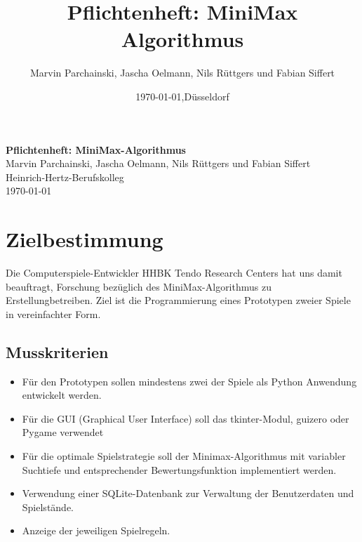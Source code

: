 \documentclass[14pt]{scrartcl}
\title{Pflichtenheft: MiniMax Algorithmus}
\author{Marvin Parchainski, Jascha Oelmann, Nils Rüttgers und Fabian Siffert}
\date{\today{},Düsseldorf}
\begin{document}
\onehalfspacing

\begin{titlepage}
    \begin{center}
    \textbf{
    \Huge{Pflichtenheft: MiniMax-Algorithmus}\\[15cm]
    }
    \Large{Marvin Parchainski, Jascha Oelmann, Nils Rüttgers und Fabian Siffert}\\[1cm]
    \large{Heinrich-Hertz-Berufskolleg\\{\today}}
    \end{center}
\end{titlepage}
\thispagestyle{empty}

 
\newpage

\tableofcontents
\thispagestyle{empty}

\newpage

\section{Zielbestimmung}
\label{sec:zielbestimmung}

Die Computerspiele-Entwickler HHBK Tendo Research Centers hat uns damit beauftragt, Forschung bezüglich des MiniMax-Algorithmus zu Erstellungbetreiben. Ziel ist die Programmierung eines Prototypen zweier Spiele in vereinfachter Form. \par 


\subsection{Musskriterien}

\begin{itemize}
    \item Für den Prototypen sollen mindestens zwei der Spiele als Python Anwendung entwickelt werden.
    \item Für die GUI (Graphical User Interface) soll das tkinter-Modul, guizero oder Pygame verwendet
    \item Für die optimale Spielstrategie soll der Minimax-Algorithmus mit variabler Suchtiefe und
    entsprechender Bewertungsfunktion implementiert werden.
    \item Verwendung einer SQLite-Datenbank zur Verwaltung der Benutzerdaten und Spielstände.
    \item Anzeige der jeweiligen Spielregeln.
\end{itemize}
\end{document}
